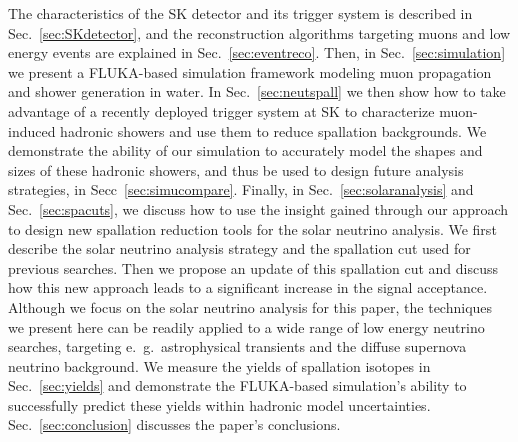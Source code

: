  The characteristics of the SK detector and its trigger system is described in Sec.~\ref{sec:SKdetector}, and the reconstruction algorithms targeting muons and low energy events are explained in Sec.~\ref{sec:eventreco}. Then, in Sec.~\ref{sec:simulation} we present a FLUKA-based simulation framework modeling muon propagation and shower generation in water.  In Sec.~\ref{sec:neutspall} we then show how to take advantage of a recently deployed trigger system at SK to characterize muon-induced hadronic showers and use them to reduce spallation backgrounds. We demonstrate the ability of our simulation to accurately model the shapes and sizes of these hadronic showers, and thus be used to design future analysis strategies, in Secc~\ref{sec:simucompare}. Finally, in Sec.~\ref{sec:solaranalysis} and Sec.~\ref{sec:spacuts}, we discuss how to use the insight gained through our approach to design new spallation reduction tools for the solar neutrino analysis. We first describe the solar neutrino analysis strategy and the spallation cut used for previous searches. Then we propose an update of this spallation cut and discuss how this new approach leads to a significant increase in the signal acceptance. Although we focus on the solar neutrino analysis for this paper, the techniques we present here can be readily applied to a wide range of low energy neutrino searches, targeting e.~g.~astrophysical transients and the diffuse supernova neutrino background. 
 We measure the yields of spallation isotopes in Sec.~\ref{sec:yields} and demonstrate the FLUKA-based simulation's ability to successfully predict these yields within hadronic model uncertainties.
 Sec.~\ref{sec:conclusion} discusses the paper's conclusions.